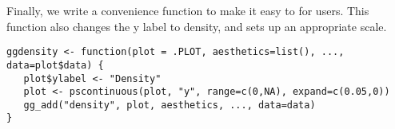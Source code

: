 Finally, we write a convenience function to make it easy to for users.  This function also changes the y label to density, and sets up an appropriate scale.

\begin{verbatim}
ggdensity <- function(plot = .PLOT, aesthetics=list(), ..., data=plot$data) {
   plot$ylabel <- "Density"
   plot <- pscontinuous(plot, "y", range=c(0,NA), expand=c(0.05,0))
   gg_add("density", plot, aesthetics, ..., data=data)
}  
\end{verbatim}



